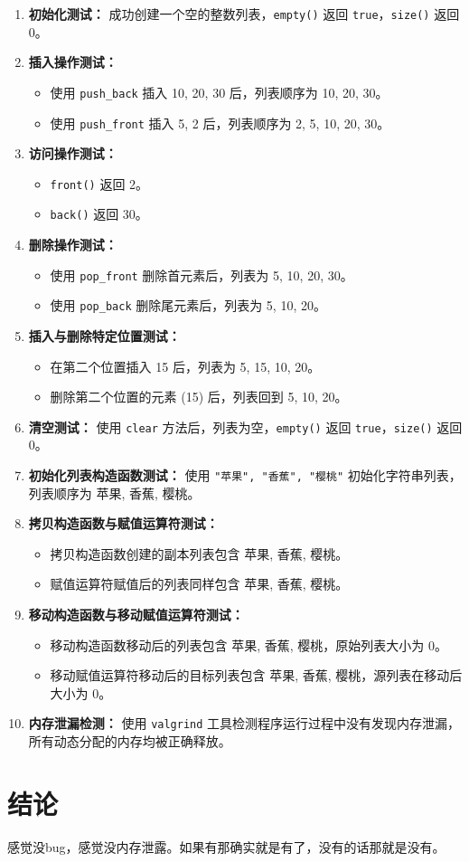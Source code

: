 \documentclass[UTF8]{ctexart}
\begin{document}
\begin{enumerate}
    \item \textbf{初始化测试：} 成功创建一个空的整数列表，\texttt{empty()} 返回 \texttt{true}，\texttt{size()} 返回 0。
    \item \textbf{插入操作测试：} 
    \begin{itemize}
        \item 使用 \texttt{push\_back} 插入 10, 20, 30 后，列表顺序为 10, 20, 30。
        \item 使用 \texttt{push\_front} 插入 5, 2 后，列表顺序为 2, 5, 10, 20, 30。
    \end{itemize}
    \item \textbf{访问操作测试：} 
    \begin{itemize}
        \item \texttt{front()} 返回 2。
        \item \texttt{back()} 返回 30。
    \end{itemize}
    \item \textbf{删除操作测试：} 
    \begin{itemize}
        \item 使用 \texttt{pop\_front} 删除首元素后，列表为 5, 10, 20, 30。
        \item 使用 \texttt{pop\_back} 删除尾元素后，列表为 5, 10, 20。
    \end{itemize}
    \item \textbf{插入与删除特定位置测试：} 
    \begin{itemize}
        \item 在第二个位置插入 15 后，列表为 5, 15, 10, 20。
        \item 删除第二个位置的元素 (15) 后，列表回到 5, 10, 20。
    \end{itemize}
    \item \textbf{清空测试：} 使用 \texttt{clear} 方法后，列表为空，\texttt{empty()} 返回 \texttt{true}，\texttt{size()} 返回 0。
    \item \textbf{初始化列表构造函数测试：} 使用 \texttt{"苹果", "香蕉", "樱桃"} 初始化字符串列表，列表顺序为 苹果, 香蕉, 樱桃。
    \item \textbf{拷贝构造函数与赋值运算符测试：} 
    \begin{itemize}
        \item 拷贝构造函数创建的副本列表包含 苹果, 香蕉, 樱桃。
        \item 赋值运算符赋值后的列表同样包含 苹果, 香蕉, 樱桃。
    \end{itemize}
    \item \textbf{移动构造函数与移动赋值运算符测试：} 
    \begin{itemize}
        \item 移动构造函数移动后的列表包含 苹果, 香蕉, 樱桃，原始列表大小为 0。
        \item 移动赋值运算符移动后的目标列表包含 苹果, 香蕉, 樱桃，源列表在移动后大小为 0。
    \end{itemize}
    \item \textbf{内存泄漏检测：} 使用 \texttt{valgrind} 工具检测程序运行过程中没有发现内存泄漏，所有动态分配的内存均被正确释放。
\end{enumerate}

\section{结论}

感觉没bug，感觉没内存泄露。如果有那确实就是有了，没有的话那就是没有。
\end{document}
